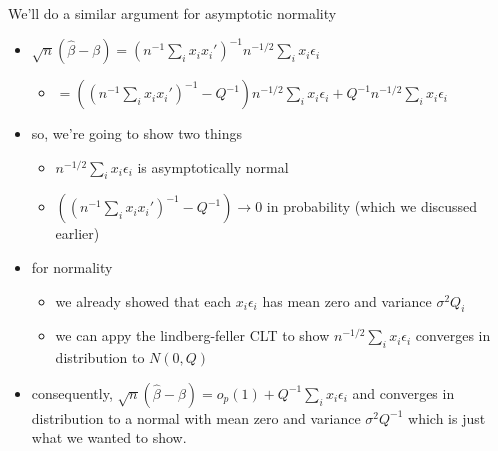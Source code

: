 \documentclass[11pt]{article}
\begin{document}
     We'll do a similar argument for asymptotic normality
\begin{itemize}
\item $\sqrt{n}(\hat\beta - \beta) = (n^{-1} \sum_i x_i x_i')^{-1}
       n^{-1/2} \sum_i x_i \epsilon_i$
\begin{itemize}
\item $= ((n^{-1} \sum_i x_i x_i')^{-1} - Q^{-1}) n^{-1/2} \sum_i
         x_i \epsilon_i + Q^{-1} n^{-1/2} \sum_i x_i \epsilon_i$
\end{itemize}
\item so, we're going to show two things
\begin{itemize}
\item $n^{-1/2} \sum_i x_i \epsilon_i$ is asymptotically normal
\item $((n^{-1} \sum_i x_i x_i')^{-1} - Q^{-1}) \to 0$ in
         probability (which we discussed earlier)
\end{itemize}
\item for normality
\begin{itemize}
\item we already showed that each $x_i \epsilon_i$ has mean zero and
         variance $\sigma^2 Q_i$
\item we can appy the lindberg-feller CLT to show $n^{-1/2} \sum_i
         x_i \epsilon_i$ converges in distribution to $N(0, Q)$
\end{itemize}
\item consequently, $\sqrt{n}(\hat\beta - \beta) = o_p(1) + Q^{-1}
       \sum_i x_i \epsilon_i$ and converges in distribution to a normal
       with mean zero and variance $\sigma^2 Q^{-1}$ which is just what
       we wanted to show.
\end{itemize}
\end{document}
